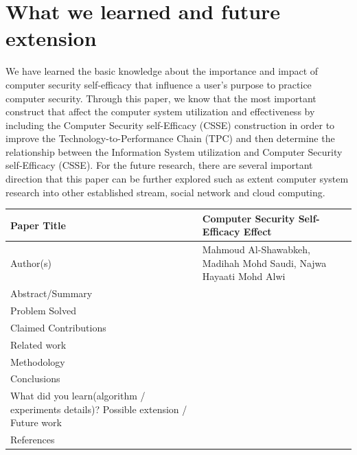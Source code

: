 \documentclass[a4paper, 12pt]{article}
\begin{document}
\section{What we learned and future extension}

We have learned the basic knowledge about the importance and impact of computer security self-efficacy that influence a user’s purpose to practice computer security. Through this paper, we know that the most important construct that affect the computer system utilization and effectiveness by including the Computer Security self-Efficacy (CSSE) construction in order to improve the Technology-to-Performance Chain (TPC) and then determine the relationship between the Information System utilization and Computer Security self-Efficacy (CSSE).
For the future research, there are several important direction that this paper can be further explored such as extent computer system research into other established stream, social network and cloud computing.


{}

\pagebreak
\begin{center}

\begin{tabular}{|m{5cm} | m{10cm} |}
\hline
Paper Title & Computer Security Self-Efficacy Effect \\ \hline

Author(s) & Mahmoud Al-Shawabkeh, Madihah Mohd Saudi, Najwa Hayaati Mohd Alwi\\ \hline

Abstract/Summary & \\ \hline 

Problem Solved & \\ \hline

Claimed Contributions & \\ \hline

Related work & \\ \hline

Methodology & \\ \hline

Conclusions & \\ \hline

What did you learn(algorithm / experiments details)? Possible extension / Future work & \\ \hline

References & \\ \hline
\end{tabular}

\end{center}
\end{document}

